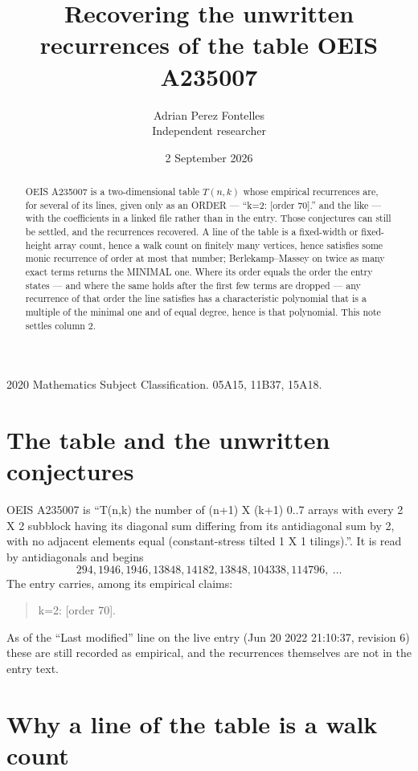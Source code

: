 \documentclass[11pt,a4paper]{article}
\title{Recovering the unwritten recurrences of the table OEIS A235007}
\author{Adrian Perez Fontelles\\ \small Independent researcher}
\date{2 September 2026}
\theoremstyle{plain}
\theoremstyle{definition}
\begin{document}
\maketitle

\begin{abstract}
OEIS A235007 is a two-dimensional table $T(n,k)$ whose empirical recurrences are, for several of
its lines, given only as an ORDER --- ``k=2: [order 70].'' and the like --- with the
coefficients in a linked file rather than in the entry. Those conjectures can still be settled,
and the recurrences recovered. A line of the table is a fixed-width or fixed-height array
count, hence a walk count on finitely many vertices, hence satisfies some monic recurrence of
order at most that number; Berlekamp--Massey on twice as many exact terms returns the MINIMAL
one. Where its order equals the order the entry states --- and where the same holds after the
first few terms are dropped --- any recurrence of that order the line satisfies has a
characteristic polynomial that is a multiple of the minimal one and of equal degree, hence is
that polynomial. This note settles column 2.
\end{abstract}

\noindent\small 2020 Mathematics Subject Classification. 05A15, 11B37, 15A18.\normalsize

\section{The table and the unwritten conjectures}

OEIS A235007 is ``T(n,k) the number of (n+1) X (k+1) 0..7 arrays with every 2 X 2 subblock having its diagonal sum differing from its antidiagonal sum by 2, with no adjacent elements equal (constant-stress tilted 1 X 1 tilings).''. It is read by antidiagonals and begins
\[
294, 1946, 1946, 13848, 14182, 13848, 104338, 114796,\ \dots
\]
The entry carries, among its empirical claims:
\begin{quote}\small
k=2: [order 70].
\end{quote}
As of the ``Last modified'' line on the live entry (Jun 20 2022 21:10:37, revision 6) these are still
recorded as empirical, and the recurrences themselves are not in the entry text.

\section{Why a line of the table is a walk count}
\end{document}
